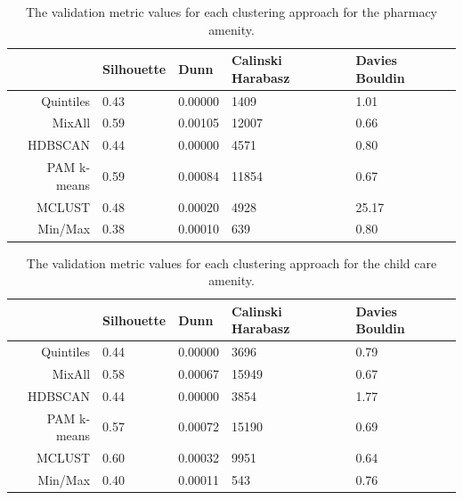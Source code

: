 \documentclass[11pt, a4paper]{article}
\begin{document}
\centering
\begin{longtable}[h]{|r|llll|}
\caption[Pharmacy validation metrics]{The validation metric values for each clustering approach for the pharmacy amenity.}\label{pharmacyvalid}
\endfirsthead
\endhead
  \hline
 & Silhouette & Dunn & Calinski Harabasz & Davies Bouldin \\
  \hline
Quintiles & 0.43 & 0.00000 &  1409 &  1.01 \\
   \hline
MixAll & \cellcolor{gray!25} 0.59 & \cellcolor{gray!25} 0.00105 & \cellcolor{gray!25}12007 & \cellcolor{gray!25} 0.66 \\
   \hline
HDBSCAN & 0.44 & 0.00000 &  4571 &  0.80 \\
   \hline
PAM k-means & \cellcolor{gray!25} 0.59 & 0.00084 & 11854 &  0.67 \\
   \hline
MCLUST & 0.48 & 0.00020 &  4928 & 25.17 \\
   \hline
Min/Max & 0.38 & 0.00010 &   639 &  0.80 \\
   \hline
\end{longtable}









\centering
\begin{longtable}[h]{|r|llll|}
\caption[Child care validation metrics]{The validation metric values for each clustering approach for the child care amenity.}\label{childcarevalid}
\endfirsthead
\endhead
 \hline
 & Silhouette & Dunn & Calinski Harabasz & Davies Bouldin \\
  \hline
Quintiles & 0.44 & 0.00000 &  3696 & 0.79 \\
   \hline
MixAll & 0.58 & 0.00067 & \cellcolor{gray!25} 15949 & 0.67 \\
   \hline
HDBSCAN & 0.44 & 0.00000 &  3854 & 1.77 \\
   \hline
PAM k-means & 0.57 & \cellcolor{gray!25} 0.00072 & 15190 & 0.69 \\
   \hline
MCLUST & \cellcolor{gray!25} 0.60 & 0.00032 &  9951 & \cellcolor{gray!25} 0.64 \\
   \hline
Min/Max & 0.40 & 0.00011 &   543 & 0.76 \\
   \hline
\end{longtable}
\end{document}
